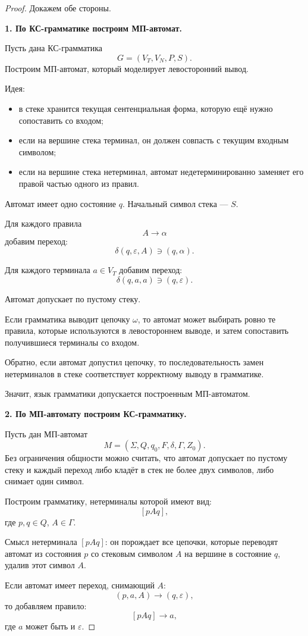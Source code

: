 \documentclass[12pt,a4paper]{article}
\newcommand{\eps}{\varepsilon}
\begin{document}
\begin{proof}
Докажем обе стороны.

\textbf{1. По КС-грамматике построим МП-автомат.}

Пусть дана КС-грамматика
\[
G=(V_T,V_N,P,S).
\]
Построим МП-автомат, который моделирует левосторонний вывод.

Идея:
\begin{itemize}
    \item в стеке хранится текущая сентенциальная форма, которую ещё нужно сопоставить со входом;
    \item если на вершине стека терминал, он должен совпасть с текущим входным символом;
    \item если на вершине стека нетерминал, автомат недетерминированно заменяет его правой частью одного из правил.
\end{itemize}

Автомат имеет одно состояние $q$.
Начальный символ стека --- $S$.

Для каждого правила
\[
A\to \alpha
\]
добавим переход:
\[
\delta(q,\eps,A)\ni(q,\alpha).
\]

Для каждого терминала $a\in V_T$ добавим переход:
\[
\delta(q,a,a)\ni(q,\eps).
\]

Автомат допускает по пустому стеку.

Если грамматика выводит цепочку $\omega$, то автомат может выбирать ровно те правила, которые используются в левостороннем выводе, и затем сопоставить получившиеся терминалы со входом.

Обратно, если автомат допустил цепочку, то последовательность замен нетерминалов в стеке соответствует корректному выводу в грамматике.

Значит, язык грамматики допускается построенным МП-автоматом.

\textbf{2. По МП-автомату построим КС-грамматику.}

Пусть дан МП-автомат
\[
M=(\Sigma,Q,q_0,F,\delta,\Gamma,Z_0).
\]
Без ограничения общности можно считать, что автомат допускает по пустому стеку и каждый переход либо кладёт в стек не более двух символов, либо снимает один символ.

Построим грамматику, нетерминалы которой имеют вид:
\[
[pAq],
\]
где $p,q\in Q$, $A\in\Gamma$.

Смысл нетерминала $[pAq]$:
он порождает все цепочки, которые переводят автомат из состояния $p$ со стековым символом $A$ на вершине в состояние $q$, удалив этот символ $A$.

Если автомат имеет переход, снимающий $A$:
\[
(p,a,A)\to(q,\eps),
\]
то добавляем правило:
\[
[pAq]\to a,
\]
где $a$ может быть и $\eps$.


\end{proof}
\end{document}
